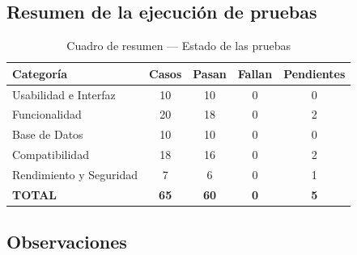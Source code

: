 \subsection{Resumen de la ejecución de pruebas}

\begin{table}[H]
    \centering
    \caption{Cuadro de resumen — Estado de las pruebas}
    \label{tab:resumen_testing}
    \begin{tabular}{|l|c|c|c|c|}
        \hline
        \textbf{Categoría} & \textbf{Casos} & \textbf{Pasan} & \textbf{Fallan} & \textbf{Pendientes} \\
        \hline
        Usabilidad e Interfaz & 10 & 10 & 0 & 0 \\
        \hline
        Funcionalidad & 20 & 18 & 0 & 2 \\
        \hline
        Base de Datos & 10 & 10 & 0 & 0 \\
        \hline
        Compatibilidad & 18 & 16 & 0 & 2 \\
        \hline
        Rendimiento y Seguridad & 7 & 6 & 0 & 1 \\
        \hline
        \textbf{TOTAL} & \textbf{65} & \textbf{60} & \textbf{0} & \textbf{5} \\
        \hline
    \end{tabular}
\end{table}

\subsection{Observaciones}

